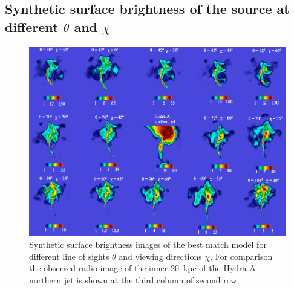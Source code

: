 \begin{appendices}


\newpage
\section{Synthetic surface brightness of the source at different $\theta$ and $\chi$}\label{A:morph}
\begin{figure}
\centering
\includegraphics[width=\linewidth]{fig10.eps}
\caption{ Synthetic surface brightness images of the best match model for different line of sights $\theta$ and viewing directions $\chi$. For comparison the observed radio image of the inner 20~kpc of the Hydra A northern jet is shown at the third column of second row. }
\label{f:morph}
\end{figure}






\end{appendices}